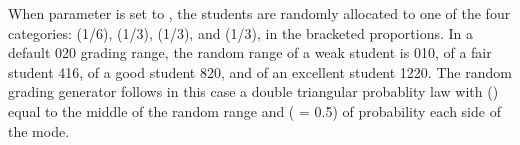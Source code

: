 \documentclass[a4paper,12pt,english]{sphinxhowto}
\begin{document}
When parameter  is set to , the students are randomly allocated to one of the four categories:  (1/6),  (1/3),  (1/3), and  (1/3), in the bracketed proportions. In a default 0\sphinxhyphen{}20 grading range, the random range of a weak student is 0\sphinxhyphen{}10, of a fair student 4\sphinxhyphen{}16, of a good student 8\sphinxhyphen{}20, and of an excellent student 12\sphinxhyphen{}20. The random grading generator follows in this case a double triangular probablity law with  () equal to the middle of the random range and  ( = 0.5) of probability each side of the mode.
\def\sphinxLiteralBlockLabel{\label{\detokenize{tutorial:academicperformancetableau}}}
\end{document}
